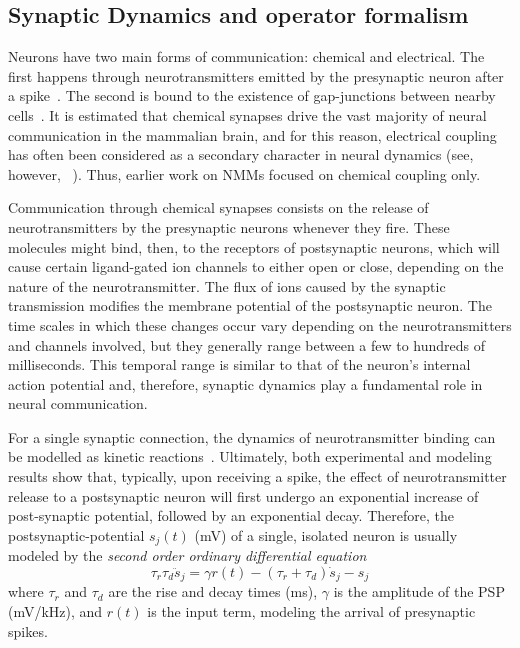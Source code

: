 \documentclass[12pt]{article}
\numberwithin{equation}{section}
\begin{document}
\subsection{Synaptic Dynamics and operator formalism}
Neurons have two main forms of communication: chemical and electrical.
The first happens through neurotransmitters emitted by the presynaptic
neuron after a spike~\cite{hillis2020}.
The second is bound to the existence of gap-junctions between nearby cells~\cite{goodenough2009}.
It is estimated that chemical synapses drive the vast majority of
neural communication in the mammalian brain, and for this reason, electrical
coupling has often been considered as a secondary character in neural dynamics (see, however, ~\cite{pereda2014,alcami2019,vaughn2022}).
Thus, earlier work on NMMs focused on chemical coupling only. %

Communication through chemical synapses consists on the release of neurotransmitters
by the presynaptic neurons whenever they fire.
These molecules might bind, then, to the receptors of postsynaptic neurons,
which will cause certain ligand-gated ion channels to either open or close, depending
on the nature of the neurotransmitter.
The flux of ions caused by the synaptic transmission modifies
 the membrane potential of the postsynaptic neuron.
The time scales in which these changes occur vary depending on the 
neurotransmitters and channels involved, but they generally range between
a few to hundreds of milliseconds.
This temporal range is similar to that of the neuron's internal action potential and, therefore, synaptic dynamics play a fundamental role in neural communication.

For a single synaptic connection, the dynamics of neurotransmitter binding
can be modelled as kinetic reactions~\cite{destexhe1994,destexhe1998,dayan2001}.
Ultimately, both experimental and modeling results show that, typically, upon receiving a spike, the effect of neurotransmitter release to a postsynaptic neuron will first undergo an exponential increase of post-synaptic potential, followed by an exponential decay. 
Therefore, the postsynaptic-potential $s_j(t)$ (mV) of a single, isolated neuron
is usually modeled by the \textit{second order ordinary differential equation}~\cite{dayan2001,gerstner2014}
\begin{equation}\label{eq:synapses_single}
    \tau_r\tau_d\ddot s_j = \gamma r(t) - (\tau_r+\tau_d) \dot s_j -s_j
\end{equation}
where $\tau_r$ and $\tau_d$ are the rise and decay times (ms), $\gamma$ is the amplitude of the PSP (mV/kHz), and $r(t)$ is the input term, modeling the arrival of presynaptic spikes.
 
\end{document}
